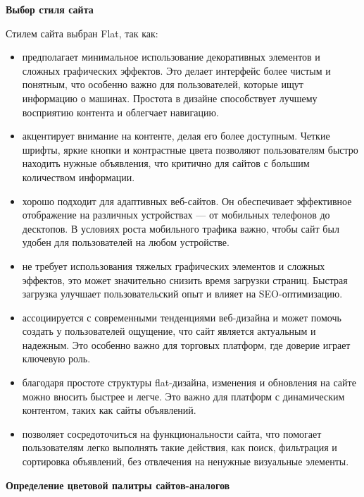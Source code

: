 \textbf{Выбор стиля сайта}

Стилем сайта выбран \guillemotleft Flat\guillemotright , так как:
\begin{itemize}
    \item предполагает минимальное использование декоративных элементов и сложных графических эффектов. Это делает интерфейс более чистым и понятным, что особенно важно для пользователей, которые ищут информацию о машинах. Простота в дизайне способствует лучшему восприятию контента и облегчает навигацию.
    \item акцентирует внимание на контенте, делая его более доступным. Четкие шрифты, яркие кнопки и контрастные цвета позволяют пользователям быстро находить нужные объявления, что критично для сайтов с большим количеством информации.
    \item хорошо подходит для адаптивных веб-сайтов. Он обеспечивает эффективное отображение на различных устройствах — от мобильных телефонов до десктопов. В условиях роста мобильного трафика важно, чтобы сайт был удобен для пользователей на любом устройстве.
    \item не требует использования тяжелых графических элементов и сложных эффектов, это может значительно снизить время загрузки страниц. Быстрая загрузка улучшает пользовательский опыт и влияет на SEO-оптимизацию.
    \item ассоциируется с современными тенденциями веб-дизайна и может помочь создать у пользователей ощущение, что сайт является актуальным и надежным. Это особенно важно для торговых платформ, где доверие играет ключевую роль.
    \item благодаря простоте структуры flat-дизайна, изменения и обновления на сайте можно вносить быстрее и легче. Это важно для платформ с динамическим контентом, таких как сайты объявлений.
    \item позволяет сосредоточиться на функциональности сайта, что помогает пользователям легко выполнять такие действия, как поиск, фильтрация и сортировка объявлений, без отвлечения на ненужные визуальные элементы.
\end{itemize}

\textbf{Определение цветовой палитры сайтов-аналогов}
\bigskip

\noindent
\begin{minipage}{\linewidth}
\end{minipage}
\bigskip

